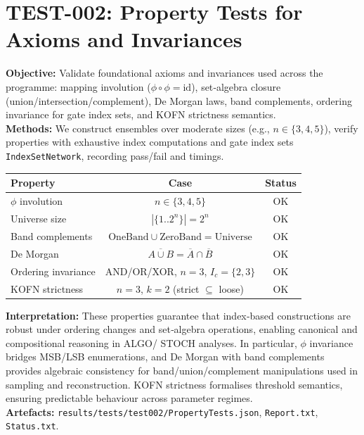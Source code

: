 \documentclass{article}
\begin{document}
\section{TEST-002: Property Tests for Axioms and Invariances}
\textbf{Objective:} Validate foundational axioms and invariances used across the programme: mapping involution ($\phi\circ\phi=\mathrm{id}$), set‑algebra closure (union/intersection/complement), De Morgan laws, band complements, ordering invariance for gate index sets, and KOFN strictness semantics.\\
\textbf{Methods:} We construct ensembles over moderate sizes (e.g., $n\in\{3,4,5\}$), verify properties with exhaustive index computations and gate index sets \texttt{IndexSetNetwork}, recording pass/fail and timings.\\
\begin{center}
\begin{tabular}{lcc}
\toprule
Property & Case & Status \\
\midrule
$\phi$ involution & $n\in\{3,4,5\}$ & OK \\
Universe size & $|\{1..2^n\}|=2^n$ & OK \\
Band complements & $\mathrm{OneBand}\cup\mathrm{ZeroBand}=\mathrm{Universe}$ & OK \\
De Morgan & $\overline{A\cup B}=\overline{A}\cap\overline{B}$ & OK \\
Ordering invariance & AND/OR/XOR, $n=3$, $I_c=\{2,3\}$ & OK \\
KOFN strictness & $n=3$, $k=2$ (strict $\subseteq$ loose) & OK \\
\bottomrule
\end{tabular}
\end{center}
\textbf{Interpretation:} These properties guarantee that index‑based constructions are robust under ordering changes and set‑algebra operations, enabling canonical and compositional reasoning in ALGO/ STOCH analyses. In particular, $\phi$ invariance bridges MSB/LSB enumerations, and De Morgan with band complements provides algebraic consistency for band/union/complement manipulations used in sampling and reconstruction. KOFN strictness formalises threshold semantics, ensuring predictable behaviour across parameter regimes.\\
\textbf{Artefacts:} \texttt{results/tests/test002/PropertyTests.json}, \texttt{Report.txt}, \texttt{Status.txt}.
\end{document}
